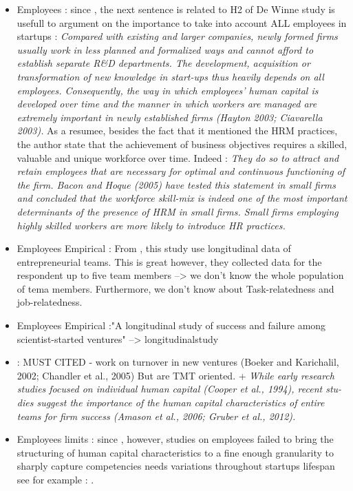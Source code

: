 \begin{itemize}
  \item Employees : since \citep{de2010interrelationships}, the next sentence is related to H2 of De Winne study is usefull to argument on the importance to take into account ALL employees in startups : \textit{Compared with existing and larger companies, newly formed firms usually work in less planned and formalized ways and cannot afford to establish separate R&D departments. The development, acquisition or transformation of new knowledge in start-ups thus heavily depends on all employees. Consequently, the way in which employees’ human capital is developed over time and the manner in which workers are managed are extremely important in newly established firms (Hayton 2003; Ciavarella 2003).} As a resumee, besides the fact that it mentioned the HRM practices, the author state that the achievement of business objectives requires a skilled, valuable and unique workforce over time. Indeed : \textit{They do so to attract and retain employees that are necessary for optimal and continuous functioning of the firm. Bacon and Hoque (2005) have tested this statement in small firms and concluded that the workforce skill-mix is indeed one of the most important determinants of the presence of HRM in small firms. Small firms employing highly skilled workers are more likely to introduce HR practices.}\\

  \item Employees Empirical : From \citep{steffens2012birds}, this study use longitudinal data of entrepreneurial teams. This is great however, they collected data for the respondent up to five team members --> we don't know the whole population of tema members. Furthermore, we don't know about Task-relatedness and job-relatedness.

  \item Employees Empirical :"A longitudinal study of success and failure among scientist-started ventures" --> longitudinalstudy

  \item : MUST CITED - work on turnover in new ventures (Boeker and Karichalil, 2002; Chandler et al., 2005) But are TMT oriented. + \citet{milosevic2016venture} \textit{While early research studies focused on individual human capital (Cooper et al., 1994), recent stu-dies suggest the importance of the human capital characteristics of entire teams for firm success (Amason et al., 2006; Gruber et al., 2012).}

  \item Employees limits : since \citep{marvel2016human}, however, studies on employees failed to bring the structuring of human capital characteristics to a fine enough granularity to sharply capture competencies needs variations throughout startups lifespan see for example : \citep{davila2003venture, alemany2005unbiased, engel2007firm, steffens2012birds}.\\
\end{itemize}

